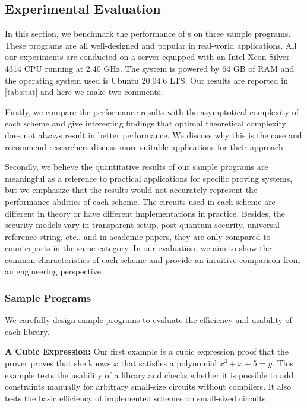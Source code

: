 \documentclass[letterpaper,twocolumn,10pt]{article}
\theoremstyle{definition}
\newcommand{\mypara}[1]{\noindent\textbf{{#1: }}}
\newcommand{\zk}{\text{zk-SNARK}\xspace}
\newcommand{\news}[1]{{#1}\xspace}
\begin{document}
\subsection{Experimental Evaluation}
In this section, we benchmark the performance of {\zk}s on three sample programs. \news{These  programs are all} well-designed and popular in real-world applications. \news{All our experiments are conducted on a server equipped with an Intel Xeon Silver 4314 CPU running at 2.40 GHz. The system is powered by 64 GB of RAM and the operating system used is Ubuntu 20.04.6 LTS.} Our results are reported in \autoref{tab:stat} and here we make two comments. 
\par Firstly, we compare the performance results with the asymptotical complexity of each scheme and give interesting findings that optimal theoretical complexity does not always result in better performance. We discuss why this is the case and recommend researchers discuss more suitable applications for their approach.
\par Secondly, we believe the quantitative
results of our sample programs are meaningful as a reference to practical applications for specific proving systems, but we emphasize that the results would not accurately represent the performance abilities of each scheme. The circuits used in each scheme are different in theory or have different implementations in practice. Besides, the security models vary in transparent setup, post-quantum security, universal reference string, etc., and in academic papers, they are only compared to counterparts in the same category. In our evaluation, we aim to show the common characteristics of each scheme and provide an intuitive comparison from an engineering perspective.

\subsubsection{Sample Programs}

We carefully design sample programs to evaluate the efficiency and usability of each library.

\mypara{A Cubic Expression} Our first example is a cubic expression proof that the prover proves that she knows $x$ that satisfies a polynomial $x^{3}+x+5=y$. This example tests the usability of a library and checks whether it is possible to add constraints manually for arbitrary small-size circuits without compilers. It also tests the basic efficiency of implemented schemes on small-sized circuits.
\end{document}
